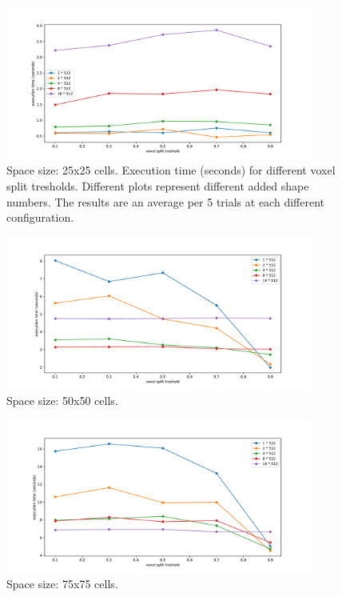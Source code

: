 \documentclass[12pt, oneside]{report}
\begin{document}
\begin{figure}[H]
  \centering
	\label{summary_res25}
	\includegraphics[width=0.9\textwidth,keepaspectratio]{Images/SummaryOptimisation/results_25.pdf}
	\caption{Space size: 25x25 cells. Execution time (seconds) for different voxel split tresholds. Different plots represent different added shape numbers. The results are an average per 5 trials at each different configuration.}
\end{figure}

\begin{figure}[H]
  \centering
	\label{summary_res50}
	\includegraphics[width=0.9\textwidth,keepaspectratio]{Images/SummaryOptimisation/results_50.pdf}
	\caption{Space size: 50x50 cells.}
\end{figure}

\begin{figure}[H]
  \centering
	\label{summary_res75}
	\includegraphics[width=0.9\textwidth,keepaspectratio]{Images/SummaryOptimisation/results_75.pdf}
	\caption{Space size: 75x75 cells. }
\end{figure}
\end{document}
